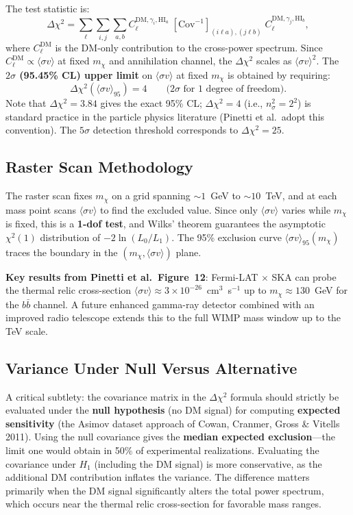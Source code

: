 \documentclass[10pt,a4paper]{article}
\newcommand{\Cl}{C_\ell}
\newcommand{\sigmav}{\langle\sigma v\rangle}
\newcommand{\mchi}{m_\chi}
\begin{document}
The test statistic is:
\begin{equation}
\Delta\chi^2
= \sum_\ell \sum_{i,j} \sum_{a,b}
C_\ell^{\mathrm{DM},\gamma_i,\mathrm{HI}_a}\;
\left[\mathrm{Cov}^{-1}\right]_{(i\ell a),(j\ell b)}\;
C_\ell^{\mathrm{DM},\gamma_j,\mathrm{HI}_b},
\label{eq:deltachi2}
\end{equation}
where $\Cl^{\mathrm{DM}}$ is the DM-only contribution to the cross-power spectrum. Since $\Cl^{\mathrm{DM}} \propto \sigmav$ at fixed $\mchi$ and annihilation channel, the $\Delta\chi^2$ scales as $\sigmav^2$. The \textbf{$2\sigma$ (95.45\% CL) upper limit} on $\sigmav$ at fixed $\mchi$ is obtained by requiring:
\begin{equation}
\Delta\chi^2(\sigmav_{95}) = 4 \qquad \text{($2\sigma$ for 1 degree of freedom)}.
\end{equation}
Note that $\Delta\chi^2 = 3.84$ gives the exact 95\% CL; $\Delta\chi^2 = 4$ (i.e., $n_\sigma^2 = 2^2$) is standard practice in the particle physics literature (Pinetti et al.\ adopt this convention). The $5\sigma$ detection threshold corresponds to $\Delta\chi^2 = 25$.


\subsection{Raster Scan Methodology}

The raster scan fixes $\mchi$ on a grid spanning $\sim 1$~GeV to $\sim 10$~TeV, and at each mass point scans $\sigmav$ to find the excluded value. Since only $\sigmav$ varies while $\mchi$ is fixed, this is a \textbf{1-dof test}, and Wilks' theorem guarantees the asymptotic $\chi^2(1)$ distribution of $-2\ln(L_0/L_1)$. The 95\% exclusion curve $\sigmav_{95}(\mchi)$ traces the boundary in the $(\mchi, \sigmav)$ plane.

\textbf{Key results from Pinetti et al.\ Figure~12}: Fermi-LAT $\times$ SKA can probe the thermal relic cross-section $\sigmav \approx 3 \times 10^{-26}$~cm$^3$~s$^{-1}$ up to $\mchi \approx 130$~GeV for the $b\bar{b}$ channel. A future enhanced gamma-ray detector combined with an improved radio telescope extends this to the full WIMP mass window up to the TeV scale.


\subsection{Variance Under Null Versus Alternative}

A critical subtlety: the covariance matrix in the $\Delta\chi^2$ formula should strictly be evaluated under the \textbf{null hypothesis} (no DM signal) for computing \textbf{expected sensitivity} (the Asimov dataset approach of Cowan, Cranmer, Gross \& Vitells 2011). Using the null covariance gives the \textbf{median expected exclusion}---the limit one would obtain in 50\% of experimental realizations. Evaluating the covariance under $H_1$ (including the DM signal) is more conservative, as the additional DM contribution inflates the variance. The difference matters primarily when the DM signal significantly alters the total power spectrum, which occurs near the thermal relic cross-section for favorable mass ranges.
\end{document}
